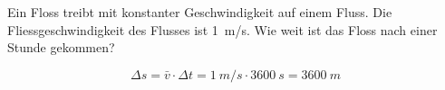 

\begin{aufgabe}
Ein Floss treibt mit konstanter Geschwindigkeit auf einem Fluss. Die Fliessgeschwindigkeit des Flusses ist \SI{1}{m/s}.
Wie weit ist das Floss nach einer Stunde gekommen?

\begin{loesung}
\begin{equation*}
  \Delta s = \bar{v}\cdot\Delta t=\SI{1}{m/s} \cdot \SI{3600}{s} = \SI{3600}{m}
\end{equation*}


\end{loesung}
\end{aufgabe}

